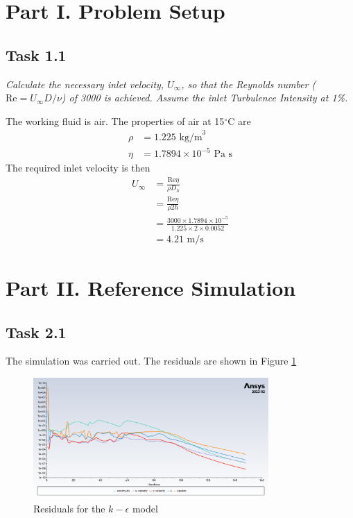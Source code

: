 \section{Part I. Problem Setup}
\subsection{Task 1.1}
\textit{Calculate the necessary inlet velocity, $U_\infty$, so that the Reynolds number ($\text{Re} = U_\infty D/\nu$) of 3000 is achieved. Assume the inlet Turbulence Intensity at 1\%.}

The working fluid is air. The properties of air at 15$^\circ$C are
\begin{align*}
    \rho &= 1.225 \text{ kg/m}^3 \\
    \eta &= 1.7894 \times 10^{-5} \text{ Pa s} 
\end{align*}
The required inlet velocity is then
\begin{align*}
    U_\infty &= \frac{\text{Re} \eta}{\rho D_h} \\
    &= \frac{\text{Re} \eta}{\rho 2h} \\
    &= \frac{3000 \times 1.7894 \times 10^{-5}}{1.225 \times 2 \times 0.0052} \\
    &= \boxed{4.21 \text{ m/s}}
\end{align*}

\section{Part II. Reference Simulation}
\subsection{Task 2.1}
The simulation was carried out. The residuals are shown in Figure \ref{fig:residuals plot}
\begin{figure}[H]
    \centering
    \includegraphics[width=0.8\textwidth]{Questions/Figures/Residuals.png}
    \caption{Residuals for the $k-\epsilon$ model}
    \label{fig:residuals plot}
\end{figure}

